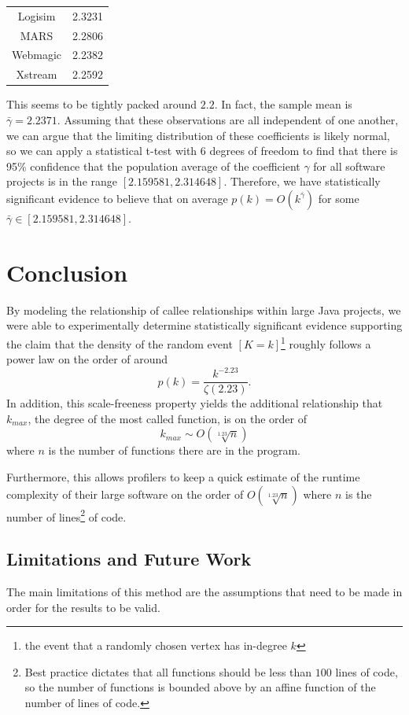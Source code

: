 \documentclass[11pt,a4paper,twocolumn]{article}
\begin{document}
\begin{singlespace}
\begin{table}[H]
\begin{tabular}{|c|c|}
Logisim \cite{Logisim} & 2.3231 \\
MARS \cite{MARS} & 2.2806 \\
Webmagic \cite{WebMagic} & 2.2382 \\
Xstream \cite{Xstream} & 2.2592 \\ \hline
\end{tabular}
\end{table}
\noindent This seems to be tightly packed around $2.2$. In fact, the sample mean is
$\bar \gamma = 2.2371$. Assuming that these observations are all independent
of one another, we can argue that the limiting distribution of these coefficients
is likely normal, so we can apply a statistical t-test with 6 degrees of freedom to find
that there is 95\% confidence that the population average of the coefficient $\gamma$
for all software projects is in the range $[2.159581, 2.314648]$. Therefore, we have
 statistically significant evidence to believe that on average
 $p(k) = O(k^{\bar \gamma})$ for some $\bar \gamma \in [2.159581, 2.314648]$.
\section{Conclusion}
By modeling the relationship of callee relationships within large Java projects, we were
able to experimentally determine statistically significant evidence supporting
the claim that the density of the random event $[K = k]$\footnote{the event that a randomly
chosen vertex has in-degree $k$} roughly follows a power law on the order of around
$$p(k) = \frac{k^{-2.23}}{\zeta(2.23)}.$$ In addition, this scale-freeness property yields
the additional relationship that $k_{max}$, the degree of the most called function, is on the order of
$$k_{max} \sim O(\sqrt[1.23]{n})$$ where $n$ is the number of functions there are in the program.

Furthermore, this allows profilers to keep a quick estimate of the runtime complexity
of their large software on the order of $O(\sqrt[1.23]{n})$ where $n$ is the number of
lines\footnote{Best practice dictates that all functions should be less than $100$ lines
of code, so the number of functions is bounded above by an affine function of
the number of lines of code.} of code.
\subsection*{Limitations and Future Work}

The main limitations of this method are the assumptions that need to be made in
order for the results to be valid.


\end{singlespace}
\end{document}
